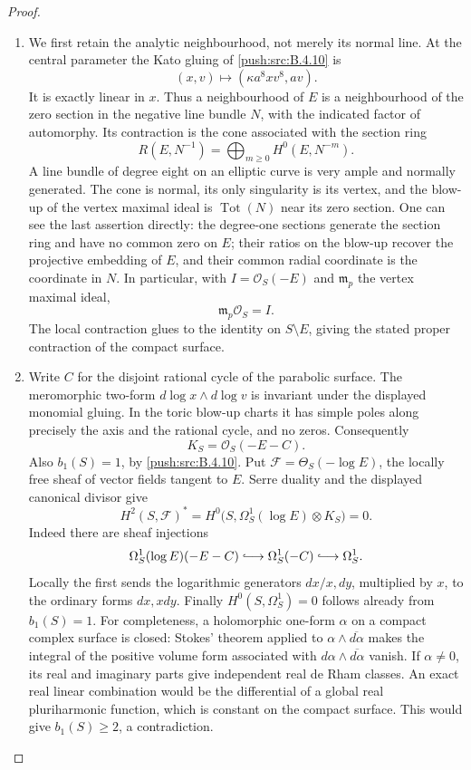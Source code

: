 \begin{proof}
\begin{enumerate}[label=\arabic*.,leftmargin=*]
\item We first retain the analytic neighbourhood, not merely its normal
line.  At the central parameter the Kato gluing of \ref{push:src:B.4.10} is
\[
 (x,v)\longmapsto(\kappa a^8xv^8,av).
\]
It is exactly linear in $x$.  Thus a neighbourhood of $E$ is a
neighbourhood of the zero section in the negative line bundle
$N$, with the indicated factor of automorphy.
Its contraction is the cone associated with the section ring
\[
 R(E,N^{-1})=\bigoplus_{m\ge0}H^0(E,N^{-m}).
\]
A line bundle of degree eight on an elliptic curve is very ample
and normally generated.  The cone is normal, its only singularity
is its vertex, and the blow-up of the vertex maximal ideal is
$\operatorname{Tot}(N)$ near its zero section.
One can see the last assertion directly: the degree-one sections
generate the section ring and have no common zero on $E$;
their ratios on the blow-up recover the projective embedding of
$E$, and their common radial coordinate is the coordinate in $N$.
In particular, with $I=\mathcal O_S(-E)$ and $\mathfrak m_p$ the
vertex maximal ideal,
\[
 \mathfrak m_p\mathcal O_S=I.
\]
The local contraction glues to the identity on $S\setminus E$,
giving the stated proper contraction of the compact surface.

\item Write $C$ for the disjoint rational cycle of the parabolic surface.
The meromorphic two-form
$d\log x\wedge d\log v$ is invariant under the displayed
monomial gluing.  In the toric blow-up charts it has simple poles
along precisely the axis and the rational cycle, and no zeros.
Consequently
\[
 K_S=\mathcal O_S(-E-C).
\]
Also $b_1(S)=1$, by \ref{push:src:B.4.10}.
Put $\mathcal F=\Theta_S(-\log E)$, the locally free sheaf of
vector fields tangent to $E$.
Serre duality and the displayed canonical divisor give
\[
 H^2(S,\mathcal F)^*
 =H^0\bigl(S,\Omega^1_S(\log E)\otimes K_S\bigr)=0.
\]
Indeed there are sheaf injections
\[
 \Omega^1_S(\log E)(-E-C)
       \lhook\joinrel\longrightarrow\Omega^1_S(-C)
       \lhook\joinrel\longrightarrow\Omega^1_S.
\]
Locally the first sends the logarithmic generators
$dx/x,dy$, multiplied by $x$, to the ordinary forms $dx,xdy$.
Finally $H^0(S,\Omega^1_S)=0$ follows already from $b_1(S)=1$.
For completeness, a holomorphic one-form $\alpha$ on a compact
complex surface is closed: Stokes' theorem applied to
$\alpha\wedge\overline{d\alpha}$ makes the integral of the
positive volume form associated with
$d\alpha\wedge\overline{d\alpha}$ vanish.
If $\alpha\ne0$, its real and imaginary parts give independent
real de Rham classes.  An exact real linear combination would
be the differential of a global real pluriharmonic function,
which is constant on the compact surface.  This would give
$b_1(S)\ge2$, a contradiction.


\end{enumerate}
\end{proof}
